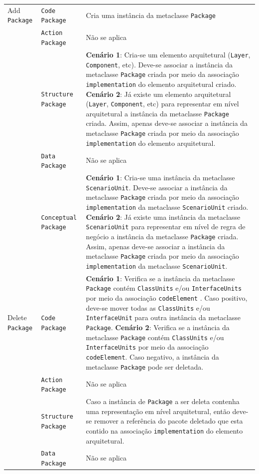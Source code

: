 \begin{longtable}{ | m{1.9cm} | m{3.57cm}| m{9.3cm} | }
 Add \texttt{Package} & \texttt{Code Package} & Cria uma instância da metaclasse \texttt{Package}\tabularnewline
\cline{2-3} 
\cline{2-3} 
 & \texttt{Action Package} & Não se aplica \tabularnewline
 \cline{2-3} 
 & \texttt{Structure Package} & \textbf{Cenário 1}: Cria-se um elemento arquitetural (\texttt{Layer}, \texttt{Component}, etc). Deve-se associar a instância da metaclasse \texttt{Package} criada por meio da associação  \texttt{implementation} do elemento arquitetural criado. \textbf{Cenário 2}: Já existe um elemento arquitetural (\texttt{Layer}, \texttt{Component}, etc) para representar em nível arquitetural a instância da metaclasse \texttt{Package} criada. Assim, apenas deve-se associar a instância da metaclasse \texttt{Package} criada por meio da associação \texttt{implementation} do elemento arquitetural. \tabularnewline
\cline{2-3} 
 & \texttt{Data Package} & Não se aplica \tabularnewline
\cline{2-3} 
 & \texttt{Conceptual Package} & \textbf{Cenário 1}: Cria-se uma instância da metaclasse \texttt{ScenarioUnit}. Deve-se associar a instância da metaclasse \texttt{Package} criada por meio da associação \texttt{implementation} da metaclasse \texttt{ScenarioUnit} criado. \textbf{Cenário 2}: Já existe uma instância da metaclasse \texttt{ScenarioUnit} para representar em nível de regra de negócio a instância da metaclasse \texttt{Package} criada. Assim, apenas deve-se associar a instância da metaclasse \texttt{Package} criada por meio da associação \texttt{implementation} da metaclasse \texttt{ScenarioUnit}. \tabularnewline
\hline 
 Delete \texttt{Package} & \texttt{Code Package} & \textbf{Cenário 1}: Verifica se a instância da metaclasse \texttt{Package} contém \texttt{ClassUnits} e/ou \texttt{InterfaceUnits}  por meio da associação \texttt{codeElement} . Caso positivo, deve-se mover todas as \texttt{ClassUnits} e/ou \texttt{InterfaceUnit} para outra instância da metaclasse \texttt{Package}. \textbf{Cenário 2}: Verifica se a instância da metaclasse \texttt{Package} contém \texttt{ClassUnits} e/ou \texttt{InterfaceUnits}  por meio da associação \texttt{codeElement}. Caso negativo, a instância da metaclasse \texttt{Package} pode ser deletada.\tabularnewline
\cline{2-3} 
& \texttt{Action Package} & Não se aplica \tabularnewline
\cline{2-3}
& \texttt{Structure Package} & Caso a instância de \texttt{Package} a ser deleta contenha uma representação em nível arquitetural, então deve-se remover a referência do pacote deletado que esta contido na associação \texttt{implementation} do elemento arquitetural. \tabularnewline
\cline{2-3}
& \texttt{Data Package} & Não se aplica \tabularnewline

\end{longtable}
